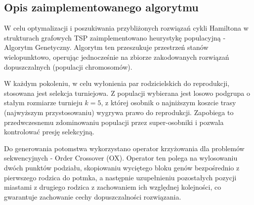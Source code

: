 \documentclass[conference]{IEEEtran}
\begin{document}
        \subsection{Opis zaimplementowanego algorytmu}
            W celu optymalizacji i poszukiwania przybliżonych rozwiązań cykli Hamiltona w strukturach grafowych TSP zaimplementowano heurystykę populacyjną - Algorytm Genetyczny. Algorytm ten przeszukuje przestrzeń stanów wielopunktowo, operując jednocześnie na zbiorze zakodowanych rozwiązań dopuszczalnych (populacji chromosomów).

            W każdym pokoleniu, w celu wyłonienia par rodzicielskich do reprodukcji, stosowana jest selekcja turniejowa. \linebreak Z populacji wybierana jest losowo podgrupa o stałym rozmiarze turnieju $k=5$, z której osobnik o najniższym koszcie trasy (najwyższym przystosowaniu) wygrywa prawo do reprodukcji. Zapobiega to przedwczesnemu zdominowaniu populacji przez super-osobniki i pozwala kontrolować presję selekcyjną.

            Do generowania potomstwa wykorzystano operator krzyżowania dla problemów sekwencyjnych - Order Crossover (OX). Operator ten polega na wylosowaniu dwóch punktów podziału, skopiowaniu wyciętego bloku genów bezpośrednio z pierwszego rodzica do potmka, a następnie uzupełnieniu pozostałych pozycji miastami z drugiego rodzica z zachowaniem ich względnej kolejności, co gwarantuje zachowanie cechy dopuszczalności rozwiązania.
        
\end{document}
